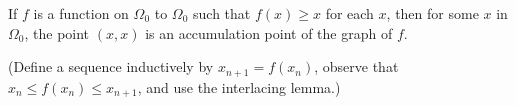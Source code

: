If $f$ is a function on $\Omega_0$ to $\Omega_0$ such that $f(x) \geq x$ for each $x$, then for some $x$ in $\Omega_0$, the point $(x, x)$ is an accumulation point of the graph of $f$.

(Define a sequence inductively by $x_{n+1} = f(x_n)$, observe that $x_n \leq f(x_n) \leq x_{n+1}$, and use the interlacing lemma.)

